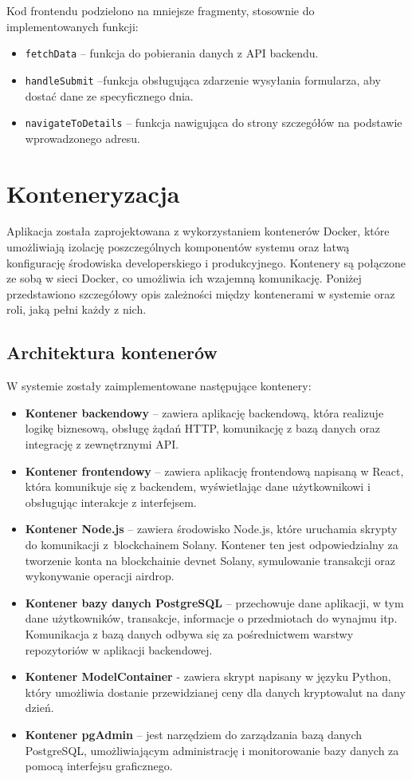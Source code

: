 Kod frontendu podzielono na mniejsze fragmenty, stosownie do implementowanych funkcji:
\begin{itemize}
    \item \texttt{fetchData} -- funkcja do pobierania danych z API backendu.
    \item \texttt{handleSubmit} --funkcja obsługująca zdarzenie wysyłania formularza, aby dostać dane ze specyficznego dnia.
    \item \texttt{navigateToDetails} -- funkcja nawigująca do strony szczegółów na podstawie wprowadzonego adresu.
\end{itemize}




\section{Konteneryzacja}
Aplikacja została zaprojektowana z wykorzystaniem kontenerów Docker, które umożliwiają izolację poszczególnych komponentów systemu oraz łatwą konfigurację środowiska developerskiego i produkcyjnego. Kontenery są połączone ze sobą w sieci Docker, co umożliwia ich wzajemną komunikację. Poniżej przedstawiono szczegółowy opis zależności między kontenerami w systemie oraz roli, jaką pełni każdy z nich.

\subsection{Architektura kontenerów}
W systemie zostały zaimplementowane następujące kontenery:
\begin{itemize}
    \item \textbf{Kontener backendowy} – zawiera aplikację backendową, która realizuje logikę biznesową, obsługę żądań HTTP, komunikację z bazą danych oraz integrację z zewnętrznymi API.
    \item \textbf{Kontener frontendowy} – zawiera aplikację frontendową napisaną w React, która komunikuje się z backendem, wyświetlając dane użytkownikowi i obsługując interakcje z interfejsem.
    \item \textbf{Kontener Node.js} – zawiera środowisko Node.js, które uruchamia skrypty do komunikacji z~blockchainem Solany. Kontener ten jest odpowiedzialny za tworzenie konta na blockchainie devnet Solany, symulowanie transakcji oraz wykonywanie operacji airdrop.
    \item \textbf{Kontener bazy danych PostgreSQL} – przechowuje dane aplikacji, w tym dane użytkowników, transakcje, informacje o przedmiotach do wynajmu itp. Komunikacja z bazą danych odbywa się za pośrednictwem warstwy repozytoriów w aplikacji backendowej.
		\item \textbf{Kontener ModelContainer} - zawiera skrypt napisany w języku Python, który umożliwia dostanie przewidzianej ceny dla danych kryptowalut na dany dzień.
    \item \textbf{Kontener pgAdmin} – jest narzędziem do zarządzania bazą danych PostgreSQL, umożliwiającym administrację i monitorowanie bazy danych za pomocą interfejsu graficznego.
\end{itemize}

